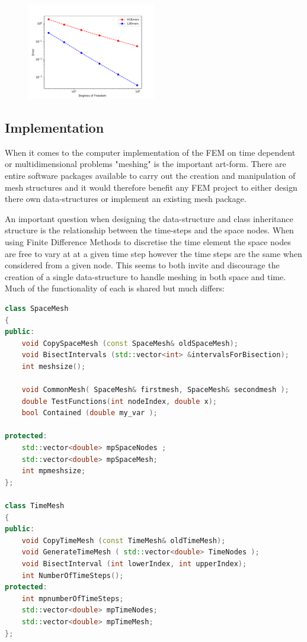 \documentclass{uonmathreport}
\theoremstyle{definition}
\theoremstyle{problem}
\theoremstyle{theorem}
\begin{document}
\begin{figure}[h]
   \includegraphics[width=0.5\textwidth]{ParabolicConvergencesOriginal.pdf}
   
 \label{fig:paraconvergences1}
\end{figure}






\subsection{Implementation} \label{subsubsec:Implementation}

When it comes to the computer implementation of the FEM on time dependent or multidimensional problems "meshing" is the important art-form. There are entire software packages available to carry out the creation and manipulation of mesh structures and it would therefore benefit any FEM project to either design there own data-structures or implement an existing mesh package. 

An important question when designing the data-structure and class inheritance structure is the relationship between the time-steps and the space nodes. When using Finite Difference Methods to discretise the time element the space nodes are free to vary at at a given time step however the time steps are the same when considered from a given node. This seems to both invite and discourage the creation of a single data-structure to handle meshing in both space and time. Much of the functionality of each is shared but much differs:

\begin{lstlisting}[language=C++]
class SpaceMesh
{
public:
    void CopySpaceMesh (const SpaceMesh& oldSpaceMesh);
    void BisectIntervals (std::vector<int> &intervalsForBisection);
    int meshsize();

    void CommonMesh( SpaceMesh& firstmesh, SpaceMesh& secondmesh );
    double TestFunctions(int nodeIndex, double x);
    bool Contained (double my_var );

protected:
    std::vector<double> mpSpaceNodes ;
    std::vector<double> mpSpaceMesh;
    int mpmeshsize;
};

class TimeMesh
{
public:
    void CopyTimeMesh (const TimeMesh& oldTimeMesh);
    void GenerateTimeMesh ( std::vector<double> TimeNodes );
    void BisectInterval (int lowerIndex, int upperIndex);
    int NumberOfTimeSteps();
protected:
    int mpnumberOfTimeSteps;
    std::vector<double> mpTimeNodes;
    std::vector<double> mpTimeMesh;
};


\end{lstlisting}
\end{document}
